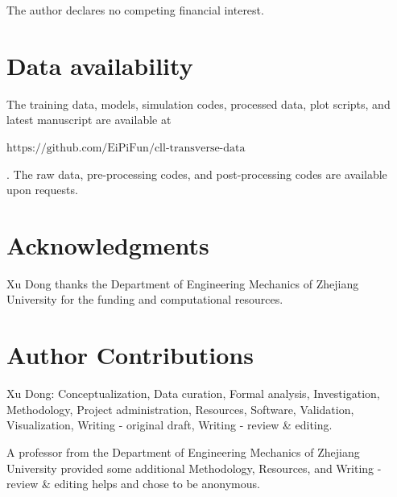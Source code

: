 \documentclass{article}
\begin{document}
The author declares no competing financial interest.

\section*{Data availability}
\addtocounter{section}{1}
\setcounter{subsection}{0}
\indent

The training data, models, simulation codes, processed data, plot scripts, and latest manuscript are available at

$\textrm{https://github.com/EiPiFun/cll-transverse-data}$

\noindent
. The raw data, pre-processing codes, and post-processing codes are available upon requests.

\section*{Acknowledgments}
\addtocounter{section}{1}
\setcounter{subsection}{0}
\indent

Xu Dong thanks the Department of Engineering Mechanics of Zhejiang University for the funding and computational resources.

\section*{Author Contributions}
\addtocounter{section}{1}
\setcounter{subsection}{0}
\indent

Xu Dong: Conceptualization, Data curation, Formal analysis, Investigation, Methodology, Project administration, Resources, Software, Validation, Visualization, Writing - original draft, Writing - review \& editing.

A professor from the Department of Engineering Mechanics of Zhejiang University provided some additional Methodology, Resources, and Writing - review \& editing helps and chose to be anonymous.
%

\linespread{1.0}\footnotesize
\addtocounter{section}{1}
\setcounter{subsection}{0}
\end{document}
